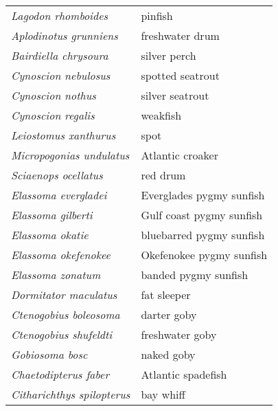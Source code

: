 \documentclass[11pt]{article}
\begin{document}
\newpage

\vspace{\baselineskip}

%
\textbf{\Student}

\begin{tabular}{@{}L{3in}L{3in}@{}}
\textit{Lagodon rhomboides} &   pinfish\tabularnewline
\textit{Aplodinotus grunniens} &   freshwater drum\tabularnewline
\textit{Bairdiella chrysoura} &   silver perch\tabularnewline
\textit{Cynoscion nebulosus} &   spotted seatrout\tabularnewline
\textit{Cynoscion nothus} &   silver seatrout\tabularnewline
\textit{Cynoscion regalis} &   weakfish\tabularnewline
\textit{Leiostomus xanthurus} &   spot\tabularnewline
\textit{Micropogonias undulatus} &   Atlantic croaker\tabularnewline
\textit{Sciaenops ocellatus} &   red drum\tabularnewline
\textit{Elassoma evergladei} &   Everglades pygmy sunfish\tabularnewline
\textit{Elassoma gilberti} &   Gulf coast pygmy sunfish\tabularnewline
\textit{Elassoma okatie} &   bluebarred pygmy sunfish\tabularnewline
\textit{Elassoma okefenokee} &   Okefenokee pygmy sunfish\tabularnewline
\textit{Elassoma zonatum} &   banded pygmy sunfish\tabularnewline
\textit{Dormitator maculatus} &   fat sleeper\tabularnewline
\textit{Ctenogobius boleosoma} &   darter goby\tabularnewline
\textit{Ctenogobius shufeldti} &   freshwater goby\tabularnewline
\textit{Gobiosoma bosc} &   naked goby\tabularnewline
\textit{Chaetodipterus faber} &   Atlantic spadefish\tabularnewline
\textit{Citharichthys spilopterus} &   bay whiff\tabularnewline
\end{tabular}

\vspace{\baselineskip}

%
\textbf{\Student}
\end{document}

